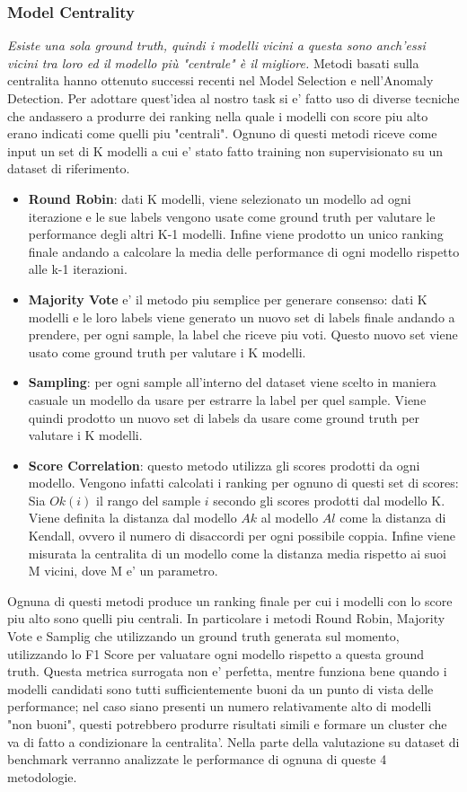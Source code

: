 \subsubsection{Model Centrality}
\textit{Esiste una sola ground truth, quindi i modelli vicini a questa sono anch'essi vicini tra loro ed il modello più "centrale" è il migliore.}
Metodi basati sulla centralita hanno ottenuto successi recenti nel Model Selection e nell'Anomaly Detection. 
Per adottare quest'idea al nostro task si e' fatto uso di diverse tecniche che andassero a produrre dei ranking nella quale i modelli con score piu alto erano indicati come quelli piu "centrali".
Ognuno di questi metodi riceve come input un set di K modelli a cui e' stato fatto training non supervisionato su un dataset di riferimento.
\begin{itemize}
\item \textbf{Round Robin}: dati K modelli, viene selezionato un modello ad ogni iterazione e le sue labels vengono usate come ground truth per valutare le performance degli altri K-1 modelli. Infine viene prodotto un unico ranking finale andando a calcolare la media delle performance di ogni modello rispetto alle k-1 iterazioni. 
\item \textbf{Majority Vote} e' il metodo piu semplice per generare consenso: dati K modelli e le loro labels viene generato un nuovo set di labels finale andando a prendere, per ogni sample, la label che riceve piu voti. Questo nuovo set viene usato come ground truth per valutare i K modelli.
\item \textbf{Sampling}: per ogni sample all'interno del dataset viene scelto in maniera casuale un modello da usare per estrarre la label per quel sample. Viene quindi prodotto un nuovo set di labels da usare come ground truth per valutare i K modelli.
\item \textbf{Score Correlation}: questo metodo utilizza gli scores prodotti da ogni modello. Vengono infatti calcolati i ranking per ognuno di questi set di scores: Sia $Ok(i)$ il rango del sample $i$ secondo gli scores prodotti dal modello K. Viene definita la distanza dal modello $Ak$ al modello $Al$ come la distanza di Kendall, ovvero il numero di disaccordi per ogni possibile coppia. Infine viene misurata la centralita di un modello come la distanza media rispetto ai suoi M vicini, dove M e' un parametro.
\end{itemize}

Ognuna di questi metodi produce un ranking finale per cui i modelli con lo score piu alto sono quelli piu centrali. In particolare i metodi Round Robin, Majority Vote e Samplig che utilizzando un ground truth generata sul momento, utilizzando lo F1 Score per valuatare ogni modello rispetto a questa ground truth.
Questa metrica surrogata non e' perfetta, mentre funziona bene quando i modelli candidati sono tutti sufficientemente buoni da un punto di vista delle performance; nel caso siano presenti un numero relativamente alto di modelli "non buoni", questi potrebbero produrre risultati simili e formare un cluster che va di fatto a condizionare la centralita'.
Nella parte della valutazione su dataset di benchmark verranno analizzate le performance di ognuna di queste 4 metodologie.


